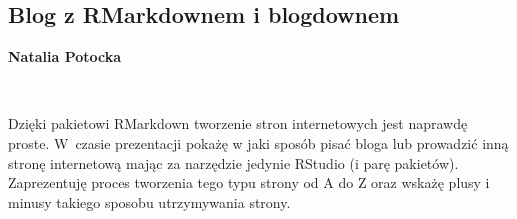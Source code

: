 \documentclass[\main/boa.tex]{subfiles}
\begin{document}
\subsection{Blog z RMarkdownem i blogdownem}

\begin{minipage}{0.915\textwidth}
	\centering
  {\bf {} Natalia Potocka }
\end{minipage}


\begin{affiliations}
\begin{minipage}{0.915\textwidth}
\centering
\ \\[-2pt]
\end{minipage}
\end{affiliations}

\vskip 0.3cm

Dzięki pakietowi RMarkdown tworzenie stron internetowych jest naprawdę proste. W~czasie prezentacji pokażę w jaki sposób pisać bloga lub prowadzić inną stronę internetową mając za narzędzie jedynie RStudio (i parę pakietów). Zaprezentuję proces tworzenia tego typu strony od A do Z oraz wskażę plusy i minusy takiego sposobu utrzymywania strony. 
\end{document}
